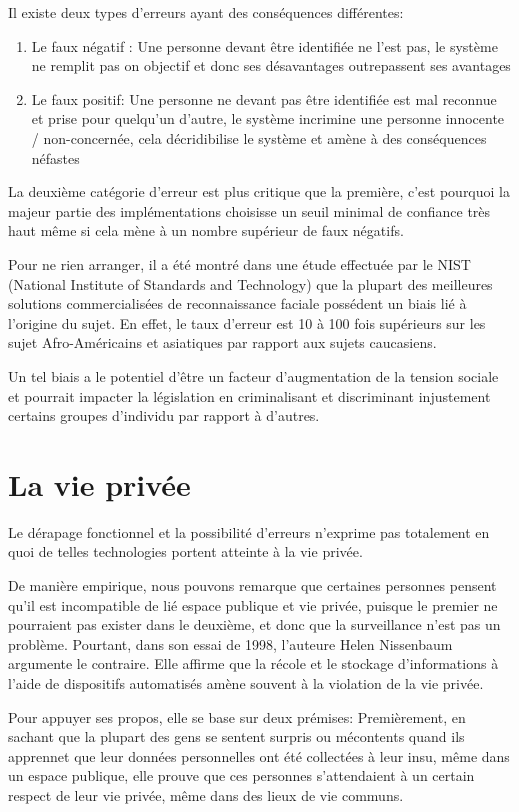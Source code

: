 Il existe deux types d’erreurs ayant des conséquences différentes:
\begin{enumerate}
\item Le faux négatif : Une personne devant être identifiée ne l’est pas, le système ne remplit pas on objectif et
donc ses désavantages outrepassent ses avantages
\item Le faux positif: Une personne ne devant pas être identifiée est mal reconnue et prise pour quelqu’un
d’autre, le système incrimine une personne innocente / non-concernée, cela décridibilise le système et
amène à des conséquences néfastes
\end{enumerate}

La deuxième catégorie d’erreur est plus critique que la première, c’est pourquoi la majeur partie des
implémentations choisisse un seuil minimal de confiance très haut même si cela mène à un nombre supérieur de
faux négatifs.

Pour ne rien arranger, il a été montré dans une étude effectuée par le NIST (National Institute of Standards and
Technology) que la plupart des meilleures solutions commercialisées de reconnaissance faciale possédent un biais
lié à l’origine du sujet. En effet, le taux d’erreur est 10 à 100 fois supérieurs sur les sujet Afro-Américains et
asiatiques par rapport aux sujets caucasiens.

Un tel biais a le potentiel d’être un facteur d’augmentation de la tension sociale et pourrait impacter la législation
en criminalisant et discriminant injustement certains groupes d’individu par rapport à d’autres.

\section{La vie privée}
Le dérapage fonctionnel et la possibilité d’erreurs n’exprime pas totalement en quoi de telles technologies portent
atteinte à la vie privée.

De manière empirique, nous pouvons remarque que certaines personnes pensent qu’il est incompatible de lié
espace publique et vie privée, puisque le premier ne pourraient pas exister dans le deuxième, et donc que la
surveillance n’est pas un problème. Pourtant, dans son essai de 1998, l’auteure Helen Nissenbaum argumente le
contraire. Elle affirme que la récole et le stockage d’informations à l’aide de dispositifs automatisés amène souvent
à la violation de la vie privée.

Pour appuyer ses propos, elle se base sur deux prémises:
Premièrement, en sachant que la plupart des gens se sentent surpris ou mécontents quand ils apprennet que leur
données personnelles ont été collectées à leur insu, même dans un espace publique, elle prouve que ces personnes
s’attendaient à un certain respect de leur vie privée, même dans des lieux de vie communs.

